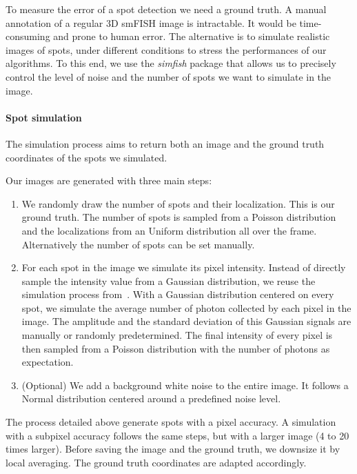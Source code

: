 To measure the error of a spot detection we need a ground truth.
A manual annotation of a regular 3D \ac{smFISH} image is intractable.
It would be time-consuming and prone to human error.
The alternative is to simulate realistic images of spots, under different conditions to stress the performances of our algorithms.
To this end, we use the \emph{simfish} package that allows us to precisely control the level of noise and the number of spots we want to simulate in the image.

\paragraph{Spot simulation}

The simulation process aims to return both an image and the ground truth coordinates of the spots we simulated.

\noindent
Our images are generated with three main steps:

\begin{enumerate}
	\item We randomly draw the number of spots and their localization.
	This is our ground truth.
	The number of spots is sampled from a Poisson distribution and the localizations from an Uniform distribution all over the frame.
	Alternatively the number of spots can be set manually.
	\item For each spot in the image we simulate its pixel intensity.
	Instead of directly sample the intensity value from a Gaussian distribution, we reuse the simulation process from~\cite{bahry_rs-fish_2021}.
	With a Gaussian distribution centered on every spot, we simulate the average number of photon collected by each pixel in the image.
	The amplitude and the standard deviation of this Gaussian signals are manually or randomly predetermined.
	The final intensity of every pixel is then sampled from a Poisson distribution with the number of photons as expectation.
	\item (Optional) We add a background white noise to the entire image.
	It follows a Normal distribution centered around a predefined noise level.
\end{enumerate}


The process detailed above generate spots with a pixel accuracy.
A simulation with a subpixel accuracy follows the same steps, but with a larger image (4 to 20 times larger).
Before saving the image and the ground truth, we downsize it by local averaging.
The ground truth coordinates are adapted accordingly.

